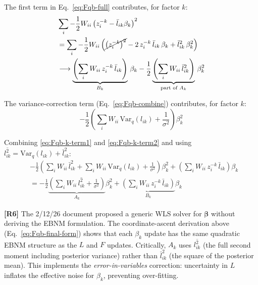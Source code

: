\documentclass[11pt]{article}
\newcommand{\lbar}[2]{\bar{l}_{#1#2}}
\newcommand{\lsec}[2]{\overline{l^2_{#1#2}}}
\begin{document}
\begin{derivbox}
The first term in Eq.~\eqref{eq:Fqb-full} contributes, for factor $k$:
\begin{align}
  &\sum_i -\frac{1}{2}W_{ii}\left(z^{-k}_i - \lbar{i}{k}\beta_k\right)^2 \nonumber\\
  &= \sum_i -\frac{1}{2}W_{ii}\left(
    \cancel{\left(z^{-k}_i\right)^2}
    - 2\,z^{-k}_i\,\lbar{i}{k}\,\beta_k
    + \lbar{i}{k}^2\,\beta_k^2
  \right) \nonumber\\
  &\longrightarrow
    \underbrace{\left(\sum_i W_{ii}\,z^{-k}_i\,\lbar{i}{k}\right)}_{B_k}\,\beta_k
    - \frac{1}{2}\underbrace{\left(\sum_i W_{ii}\,\lbar{i}{k}^2\right)}_{\text{part of }A_k}\,\beta_k^2
  \label{eq:Fqb-k-term1}
\end{align}

The variance-correction term (Eq.~\eqref{eq:Fqb-combine}) contributes, for factor $k$:
\begin{equation}
  -\frac{1}{2}\left(\sum_i W_{ii}\,\mathrm{Var}_q(l_{ik}) + \frac{1}{\sigma^2}\right)\beta_k^2
  \label{eq:Fqb-k-term2}
\end{equation}

Combining \eqref{eq:Fqb-k-term1} and \eqref{eq:Fqb-k-term2} and using
$\lsec{i}{k} = \mathrm{Var}_q(l_{ik}) + \lbar{i}{k}^2$:
\begin{align}
  &-\frac{1}{2}\left(\sum_i W_{ii}\,\lbar{i}{k}^2
                    + \sum_i W_{ii}\,\mathrm{Var}_q(l_{ik})
                    + \frac{1}{\sigma^2}\right)\beta_k^2
   + \left(\sum_i W_{ii}\,z^{-k}_i\,\lbar{i}{k}\right)\beta_k \nonumber\\
  &= -\frac{1}{2}\underbrace{\left(\sum_i W_{ii}\,\lsec{i}{k} + \frac{1}{\sigma^2}\right)}_{A_k}\beta_k^2
     + \underbrace{\left(\sum_i W_{ii}\,z^{-k}_i\,\lbar{i}{k}\right)}_{B_k}\beta_k
  \label{eq:Fqb-final-form}
\end{align}
\end{derivbox}

\begin{correctionbox}
\textbf{[R6]} The 2/12/26 document proposed a generic WLS solver for $\bm{\beta}$
without deriving the EBNM formulation.  The coordinate-ascent derivation above
(Eq.~\eqref{eq:Fqb-final-form}) shows that each $\beta_k$ update has the same
quadratic EBNM structure as the $L$ and $F$ updates.  Critically, $A_k$ uses
$\lsec{i}{k}$ (the full second moment including posterior variance) rather than
$\lbar{i}{k}^2$ (the square of the posterior mean).  This implements the
\emph{error-in-variables} correction: uncertainty in $L$ inflates the effective
noise for $\beta_k$, preventing over-fitting.
\end{correctionbox}
\end{document}
